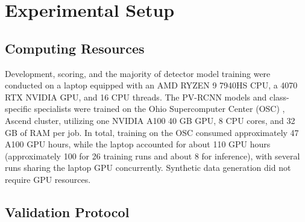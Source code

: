 \documentclass[conference]{IEEEtran}
\newcommand{\ph}[1]{\textcolor{red}{[#1]}}
\begin{document}
\section{Experimental Setup}
\label{sec:setup}

\subsection{Computing Resources}

Development, scoring, and the majority of detector model training were conducted on a laptop equipped with an AMD RYZEN 9 7940HS CPU, a 4070 RTX NVIDIA GPU, and 16 CPU threads. The PV-RCNN models and class-specific specialists were trained on the Ohio Supercomputer Center (OSC) \cite{ref_osc}, Ascend cluster, utilizing one NVIDIA A100 40 GB GPU, 8 CPU cores, and 32 GB of RAM per job. In total, training on the OSC consumed approximately 47 A100 GPU hours, while the laptop accounted for about 110 GPU hours (approximately 100 for 26 training runs and about 8 for inference), with several runs sharing the laptop GPU concurrently. Synthetic data generation did not require GPU resources.

\subsection{Validation Protocol}
\end{document}
